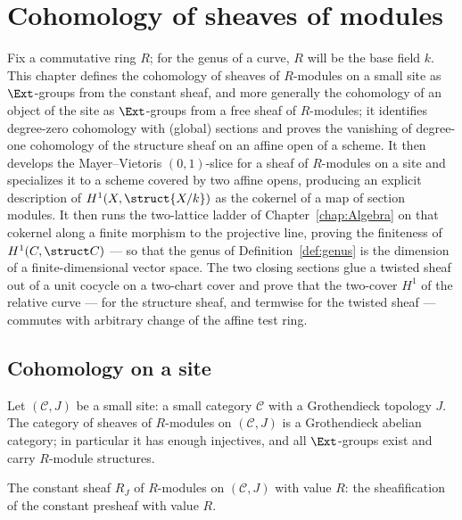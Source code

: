 \chapter{Cohomology of sheaves of modules}
\label{chap:Cohomology}

Fix a commutative ring \(R\); for the genus of a curve, \(R\) will be the base field \(k\).
This chapter defines the cohomology of sheaves of \(R\)-modules on a small site as
\(\Ext\)-groups from the constant sheaf, and more generally the cohomology of an object of
the site as \(\Ext\)-groups from a free sheaf of \(R\)-modules; it identifies degree-zero
cohomology with (global) sections and proves the vanishing of degree-one cohomology of the
structure sheaf on an affine open of a scheme. It then develops the Mayer--Vietoris
\((0,1)\)-slice for a sheaf of \(R\)-modules on a site and specializes it to a scheme
covered by two affine opens, producing an explicit description of \(H^1(X,\struct{X/k})\)
as the cokernel of a map of section modules. It then runs the
two-lattice ladder of Chapter~\ref{chap:Algebra} on that cokernel along a finite morphism
to the projective line, proving the finiteness of \(H^1(C, \struct C)\) --- so that the
genus of Definition~\ref{def:genus} is the dimension of a finite-dimensional vector space.
The two closing sections glue a twisted sheaf out of a unit cocycle on a two-chart cover
and prove that the two-cover \(H^1\) of the relative curve --- for the structure sheaf,
and termwise for the twisted sheaf --- commutes with arbitrary change of the affine test
ring.

\section{Cohomology on a site}

Let \((\mathcal C, J)\) be a small site: a small category \(\mathcal C\) with a Grothendieck
topology \(J\). The category of sheaves of \(R\)-modules on \((\mathcal C, J)\) is a
Grothendieck abelian category; in particular it has enough injectives, and all
\(\Ext\)-groups exist and carry \(R\)-module structures.

\begin{definition}
  \label{def:constModuleSheaf}
  \leanok
  The constant sheaf \(R_J\) of \(R\)-modules on \((\mathcal C, J)\) with value \(R\): the
  sheafification of the constant presheaf with value \(R\).
\end{definition}

